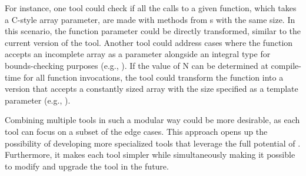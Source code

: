 For instance, one tool could check if all the calls to a given function, which takes a C-style array parameter, are made with  methods from s with the same size. In this scenario, the function parameter could be directly transformed, similar to the current version of the tool. 
Another tool could address cases where the function accepts an incomplete array as a parameter alongside an integral type for bounds-checking purposes (e.g., ).
If the value of N can be determined at compile-time for all function invocations, the tool could transform the function into a version that accepts a constantly sized array with the size specified as a template parameter (e.g., ).

Combining multiple tools in such a modular way could be more desirable, as each tool can focus on a subset of the edge cases. This approach opens up the possibility of developing more specialized tools that leverage the full potential of .
Furthermore, it makes each tool simpler while simultaneously making it possible to modify and upgrade the tool in the future.
